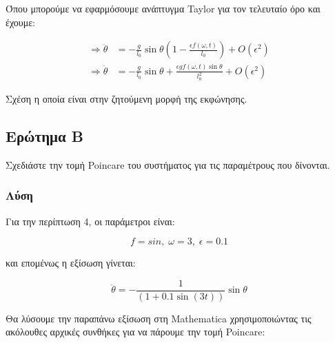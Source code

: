 \documentclass{article}
\begin{document}
Όπου μπορούμε να εφαρμόσουμε ανάπτυγμα \textlatin{Taylor} για τον τελευταίο όρο και έχουμε:

\begin{align}
    \Rightarrow \ddot{\theta} &=-\frac{g}{l_{0}} \sin \theta (1-\frac{\epsilon f(\omega, t)}{l_{0}})+Ο(\epsilon^{2}) \\
    \Rightarrow \ddot{\theta} &=-\frac{g}{l_{0}} \sin \theta + \frac{\epsilon g f(\omega, t) \sin \theta}{l_{0}^2}+Ο(\epsilon^{2})
\end{align}

Σχέση η οποία είναι στην ζητούμενη μορφή της εκφώνησης.

\subsection{Ερώτημα Β}

\indent Σχεδιάστε την τομή \textlatin{Poincare} του συστήματος για τις παραμέτρους που δίνονται.

\subsubsection{Λύση}

\indent
Για την περίπτωση 4,  οι παράμετροι είναι: 

\begin{equation}
    f=sin,\; \omega=3,\; \epsilon=0.1 
\end{equation}

και επομένως η εξίσωση γίνεται:

\begin{equation}
    \ddot{\theta} =-\frac{1}{(1+0.1 \sin (3 t))} \sin \theta
\end{equation}

Θα λύσουμε την παραπάνω εξίσωση στη \textlatin{Mathematica} χρησιμοποιώντας τις ακόλουθες αρχικές συνθήκες για να πάρουμε την τομή \textlatin{Poincare}:
\end{document}
